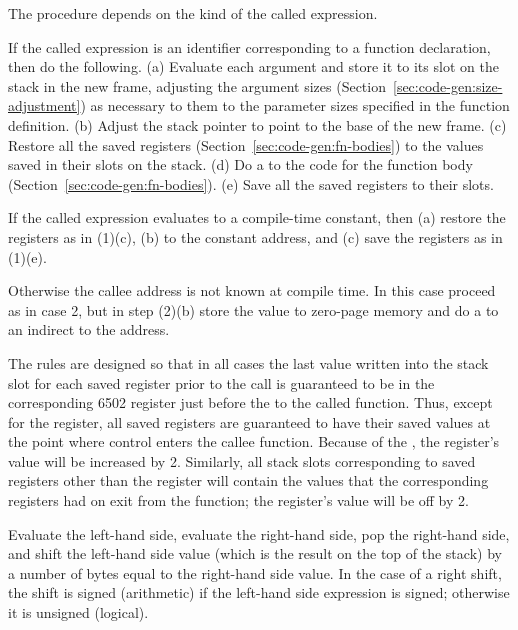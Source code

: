 \documentclass[10pt]{article}
\begin{document}
 The procedure depends on the kind of the
called expression.

 If the called expression is an
identifier corresponding to a function declaration, then do the
following.  (a) Evaluate each argument and store it to its slot on the
stack in the new frame, adjusting the argument sizes
(Section~\ref{sec:code-gen:size-adjustment}) as necessary to them to
the parameter sizes specified in the function definition. (b) Adjust
the stack pointer to point to the base of the new frame.  (c) Restore
all the saved registers (Section~\ref{sec:code-gen:fn-bodies}) to the
values saved in their slots on the stack.  (d) Do a  to the
code for the function body (Section~\ref{sec:code-gen:fn-bodies}). (e)
Save all the saved registers to their slots.

 If the called expression
evaluates to a compile-time constant, then (a) restore the registers
as in (1)(c), (b)  to the constant address, and (c) save the
registers as in (1)(e).

 Otherwise the callee address is
not known at compile time.  In this case proceed as in case 2, but in
step (2)(b) store the value to zero-page memory and do a  to
an indirect  to the address.

The rules are designed so that in all cases the last value written
into the stack slot for each saved register prior to the call is
guaranteed to be in the corresponding 6502 register just before the
 to the called function.  Thus, except for the 
register, all saved registers are guaranteed to have their saved
values at the point where control enters the callee function.  Because
of the , the  register's value will be increased by 2.
Similarly, all stack slots corresponding to saved registers other than
the  register will contain the values that the corresponding
registers had on exit from the function; the  register's value
will be off by 2.

  Evaluate the left-hand side, evaluate the
right-hand side, pop the right-hand side, and shift the left-hand side
value (which is the result on the top of the stack) by a number of
bytes equal to the right-hand side value.  In the case of a right
shift, the shift is signed (arithmetic) if the left-hand side
expression is signed; otherwise it is unsigned (logical).
\end{document}
